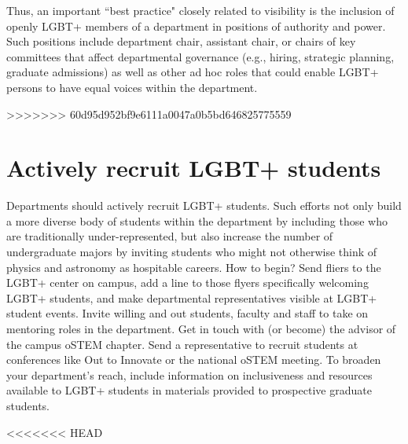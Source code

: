 Thus, an important ``best practice" closely related to visibility is the inclusion of openly LGBT+ members of a department in positions of authority and power. Such positions include department chair, assistant chair, or chairs of key committees that affect departmental governance (e.g., hiring, strategic planning, graduate admissions) as well as other ad hoc roles that could enable LGBT+ persons to have equal voices within the department.

>>>>>>> 60d95d952bf9e6111a0047a0b5bd646825775559
\section {Actively recruit LGBT+ students}
\label{recruit-students}
Departments should actively recruit LGBT+ students. Such efforts not only build a more diverse body of students within the department by including those who are traditionally under-represented, but also increase the number of undergraduate majors by inviting students who might not otherwise think of physics and astronomy as hospitable careers. How to begin?  Send fliers to the LGBT+ center on campus, add a line to those flyers specifically welcoming LGBT+ students, and make departmental representatives visible at LGBT+ student events.  Invite willing and out students, faculty and staff to take on mentoring roles in the department.  Get in touch with (or become) the advisor of the campus oSTEM chapter.  Send a representative to recruit students at conferences like Out to Innovate or the national oSTEM meeting.  To broaden your department's reach, include information on inclusiveness and resources available to LGBT+ students in materials provided to prospective graduate students. 

<<<<<<< HEAD
